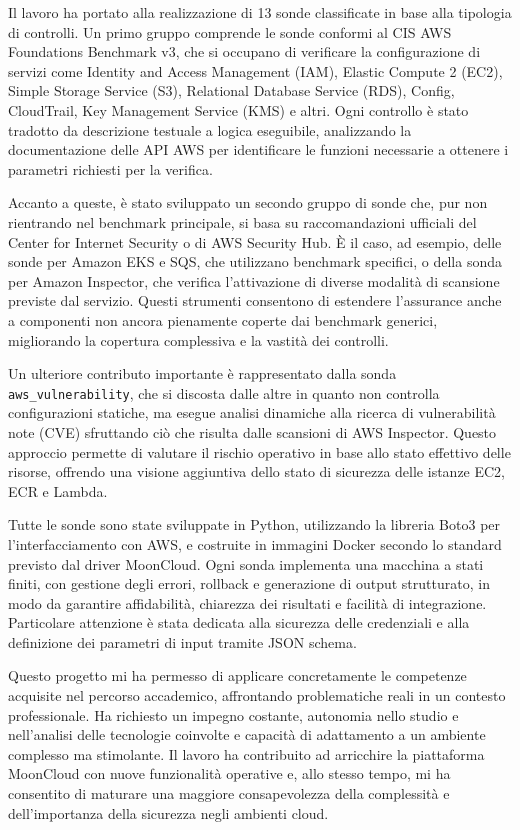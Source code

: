 \documentclass[12pt]{article}
\begin{document}
Il lavoro ha portato alla realizzazione di 13 sonde classificate in base alla tipologia di controlli. Un primo gruppo comprende le sonde conformi al CIS AWS Foundations Benchmark v3, che si occupano di verificare la configurazione di servizi come Identity and Access Management (IAM), Elastic Compute 2 (EC2), Simple Storage Service (S3), Relational Database Service (RDS), Config, CloudTrail, Key Management Service (KMS) e altri. Ogni controllo è stato tradotto da descrizione testuale a logica eseguibile, analizzando la documentazione delle API AWS per identificare le funzioni necessarie a ottenere i parametri richiesti per la verifica. 

Accanto a queste, è stato sviluppato un secondo gruppo di sonde che, pur non rientrando nel benchmark principale, si basa su raccomandazioni ufficiali del Center for Internet Security o di AWS Security Hub. È il caso, ad esempio, delle sonde per Amazon EKS e SQS, che utilizzano benchmark specifici, o della sonda per Amazon Inspector, che verifica l'attivazione di diverse modalità di scansione previste dal servizio. Questi strumenti consentono di estendere l'assurance anche a componenti non ancora pienamente coperte dai benchmark generici, migliorando la copertura complessiva e la vastità dei controlli.

Un ulteriore contributo importante è rappresentato dalla sonda \texttt{aws\_vulnerability}, che si discosta dalle altre in quanto non controlla configurazioni statiche, ma esegue analisi dinamiche alla ricerca di vulnerabilità note (CVE) sfruttando ciò che risulta dalle scansioni di AWS Inspector. Questo approccio permette di valutare il rischio operativo in base allo stato effettivo delle risorse, offrendo una visione aggiuntiva dello stato di sicurezza delle istanze EC2, ECR e Lambda.

Tutte le sonde sono state sviluppate in Python, utilizzando la libreria Boto3 per l'interfacciamento con AWS, e costruite in immagini Docker secondo lo standard previsto dal driver MoonCloud. Ogni sonda implementa una macchina a stati finiti, con gestione degli errori, rollback e generazione di output strutturato, in modo da garantire affidabilità, chiarezza dei risultati e facilità di integrazione. Particolare attenzione è stata dedicata alla sicurezza delle credenziali e alla definizione dei parametri di input tramite JSON schema.

Questo progetto mi ha permesso di applicare concretamente le competenze acquisite nel percorso accademico, affrontando problematiche reali in un contesto professionale. Ha richiesto un impegno costante, autonomia nello studio e nell'analisi delle tecnologie coinvolte e capacità di adattamento a un ambiente complesso ma stimolante. Il lavoro ha contribuito ad arricchire la piattaforma MoonCloud con nuove funzionalità operative e, allo stesso tempo, mi ha consentito di maturare una maggiore consapevolezza della complessità e dell'importanza della sicurezza negli ambienti cloud.
\end{document}
